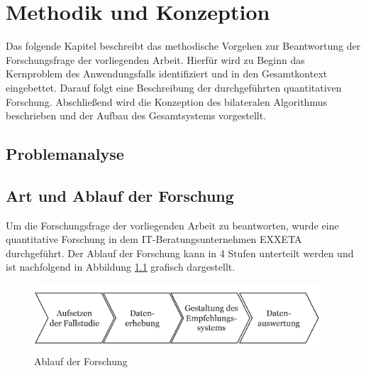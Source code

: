 
\chapter{Methodik und Konzeption}
\label{ch:methodik}
Das folgende Kapitel beschreibt das methodische Vorgehen zur Beantwortung der Forschungsfrage der vorliegenden Arbeit.
Hierfür wird zu Beginn das Kernproblem des Anwendungsfalls identifiziert und in den Gesamtkontext eingebettet.
Darauf folgt eine Beschreibung der durchgeführten quantitativen Forschung.
Abschließend wird die Konzeption des bilateralen Algorithmus beschrieben und der Aufbau des Gesamtsystems vorgestellt.

\section{Problemanalyse}


\section{Art und Ablauf der Forschung}
Um die Forschungsfrage der vorliegenden Arbeit zu beantworten, wurde eine quantitative Forschung in dem IT-Beratungsunternehmen EXXETA durchgeführt.
Der Ablauf der Forschung kann in 4 Stufen unterteilt werden und ist nachfolgend in Abbildung \ref{fig:methodik:abb1} grafisch dargestellt.

\begin{figure}[H]
    \centering
	\includegraphics[width=0.95\textwidth]{gfx/prozess-forschung.png}
	\caption[Ablauf der Forschung]{Ablauf der Forschung}
	\label{fig:methodik:abb1}
\end{figure}

